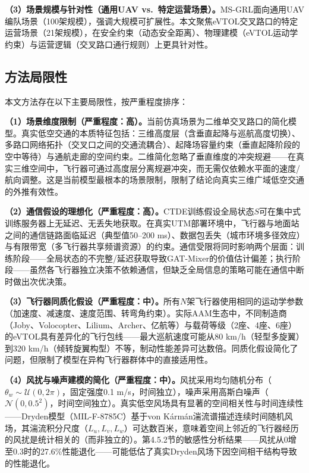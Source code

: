 \documentclass[12pt,a4paper,UTF8]{ctexart}
\begin{document}
\textbf{（3）场景规模与针对性（通用UAV vs.\ 特定运营场景）。}MS-GRL面向通用UAV编队场景（100架规模），强调大规模可扩展性。本文聚焦eVTOL交叉路口的特定运营场景（21架规模），在安全约束（动态安全距离）、物理建模（eVTOL运动学约束）与运营逻辑（交叉路口通行规则）上更具针对性。

\subsection{方法局限性}

本文方法存在以下主要局限性，按严重程度排序：

\textbf{（1）场景维度限制（严重程度：高）。}当前仿真场景为二维单交叉路口的简化模型。真实低空交通的本质特征包括：三维高度层（含垂直起降与巡航高度切换）、多路口网络拓扑（交叉口之间的交通流耦合）、起降场容量约束（垂直起降阶段的空中等待）与通航走廊的空间约束。二维简化忽略了垂直维度的冲突规避——在真实三维空间中，飞行器可通过高度层分离规避冲突，而无需仅依赖水平面的速度/航向调整。这是当前模型最根本的场景限制，限制了结论向真实三维广域低空交通的外推有效性。

\textbf{（2）通信假设的理想化（严重程度：高）。}CTDE训练假设全局状态$S$可在集中式训练服务器上无延迟、无丢失地获取。在真实UTM部署环境中，飞行器与地面站之间的通信链路面临延迟（典型值50--200 ms）、数据包丢失（城市环境多径效应）与有限带宽（多飞行器共享频谱资源）的约束。通信受限将同时影响两个层面：训练阶段——全局状态的不完整/延迟获取导致GAT-Mixer的价值估计偏差；执行阶段——虽然各飞行器独立决策不依赖通信，但缺乏全局信息的策略可能在通信中断时做出次优决策。

\textbf{（3）飞行器同质化假设（严重程度：中）。}所有$N$架飞行器使用相同的运动学参数（加速度、减速度、速度范围、转弯角约束）。实际AAM生态中，不同制造商（Joby、Volocopter、Lilium、Archer、亿航等）与载荷等级（2座、4座、6座）的eVTOL具有差异化的飞行包线——最大巡航速度可能从80 km/h（轻型多旋翼）到320 km/h（倾转旋翼构型）不等，制动性能差异可达数倍。同质化假设简化了问题，但限制了模型在异构飞行器群体中的直接适用性。

\textbf{（4）风扰与噪声建模的简化（严重程度：中）。}风扰采用均匀随机分布（$\theta_w \sim \mathcal{U}(0, 2\pi)$，固定强度0.1 m/s，时间独立），噪声采用高斯白噪声（$\mathcal{N}(0, 0.5^2)$，时间空间独立）。真实低空风场具有显著的空间相关性与时间连续性——Dryden模型（MIL-F-8785C）\cite{ref20}基于von K\'{a}rm\'{a}n湍流谱描述连续时间随机风场，其湍流积分尺度（$L_u, L_v, L_w$）可达数百米，意味着空间上邻近的飞行器经历的风扰是统计相关的（而非独立的）。第4.5.2节的敏感性分析结果——风扰从0增至0.3时的27.6\%性能退化——可能低估了真实Dryden风场下因空间相干结构导致的性能退化。
\end{document}
